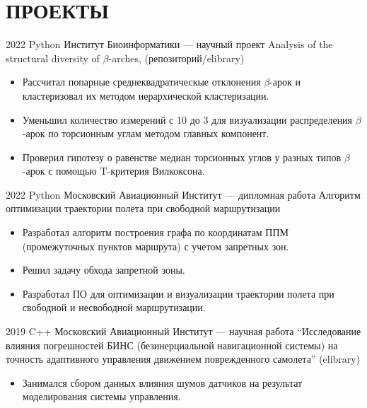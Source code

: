 \section{ПРОЕКТЫ}

    \project
    {2022}
    {Python}
    {Институт Биоинформатики — научный проект}
    {Analysis of the structural diversity of $\beta$-arches, (репозиторий/elibrary)}
    \begin{itemize}
        \setlength\itemsep{-.5em}
        \item Рассчитал попарные среднеквадратическые отклонения $\beta$-арок и кластеризовал их методом иерархической кластеризации.
        \item Уменьшил количество измерений с 10 до 3 для визуализации распределения $\beta$-арок по торсионным углам методом главных компонент.
        \item Проверил гипотезу о равенстве медиан торсионных углов у разных типов $\beta$-арок с помощью T-критерия Вилкоксона.
    \end{itemize}
    
    \project
    {2022}
    {Python}
    {Московский Авиационный Институт — дипломная работа}
    {Алгоритм оптимизации траектории полета при свободной маршрутизации}
    \begin{itemize}
        \setlength\itemsep{-.5em}
        \item Разработал алгоритм построения графа по координатам ППМ (промежуточных пунктов маршрута) с учетом запретных зон.
        \item Решил задачу обхода запретной зоны.
        \item Разработал ПО для оптимизации и визуализации траектории полета при свободной и несвободной маршрутизации.
    \end{itemize}
    
    \project
    {2019}
    {C++}
    {Московский Авиационный Институт — научная работа}
    {“Исследование влияния погрешностей БИНС (безинерциальной навигационной системы) на точность адаптивного управления движением поврежденного самолета” (elibrary)}
    \begin{itemize}
        \setlength\itemsep{-.5em}
        \item Занимался сбором данных влияния шумов датчиков на результат моделирования системы управления.
    \end{itemize}

